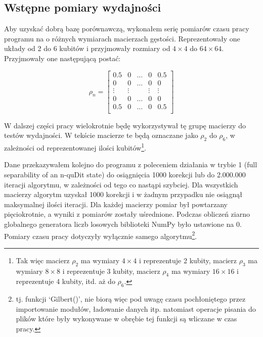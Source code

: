 \documentclass[10pt, a4paper]{article}
\begin{document}
\begin{sloppypar}
    \subsection{Wstępne pomiary wydajności}


    Aby uzyskać dobrą bazę porównawczą, wykonałem serię pomiarów czasu pracy programu na
    o różnych wymiarach macierzach gęstości. Reprezentowały one układy od 2 do 6 kubitów
    i przyjmowały rozmiary od $4\times4$ do $64\times64$. Przyjmowały one następującą
    postać:

    \[
      \rho_{n}=
      \begin{bmatrix}
        0.5    & 0      & \hdots & 0      & 0.5    \\
        0      & 0      & \hdots & 0      & 0      \\
        \vdots & \vdots &        & \vdots & \vdots \\
        0      & 0      & \hdots & 0      & 0      \\
        0.5    & 0      & \hdots & 0      & 0.5    \\
      \end{bmatrix}
    \]

    W dalszej części pracy wielokrotnie będę wykorzystywał tę grupę macierzy do testów wydajności.
    W tekście macierze te będą oznaczane jako $\rho_{2}$ do $\rho_{6}$, w zależności od reprezentowanej
    ilości kubitów\footnote{Tak więc macierz $\rho_{2}$ ma wymiary $4\times4$ i
    reprezentuje 2 kubity, macierz $\rho_{3}$ ma wymiary $8\times8$ i reprezentuje 3 kubity,
    macierz $\rho_{4}$ ma wymiary $16\times16$ i reprezentuje 4 kubity, itd. aż do
    $\rho_{6}$.}.

    Dane przekazywałem kolejno do programu z poleceniem działania w trybie 1 (full separability
    of an n-quDit state) do osiągnięcia 1000 korekcji lub do 2.000.000 iteracji algorytmu,
    w zależności od tego co nastąpi szybciej. Dla wszystkich macierzy algorytm uzyskał 1000
    korekcji i w żadnym przypadku nie osiągnął maksymalnej ilości iteracji. Dla każdej
    macierzy pomiar był powtarzany pięciokrotnie, a wyniki z pomiarów zostały uśrednione.
    Podczas obliczeń ziarno globalnego generatora liczb losowych biblioteki NumPy było
    ustawione na 0. Pomiary czasu pracy dotyczyły wyłącznie samego algorytmu\footnote{tj.
    funkcji `Gilbert()', nie biorą więc pod uwagę czasu pochłoniętego przez importowanie
    modułów, ładowanie danych itp. natomiast operacje pisania do plików które były wykonywane
    w obrębie tej funkcji są wliczane w czas pracy.}.


\end{sloppypar}
\end{document}
